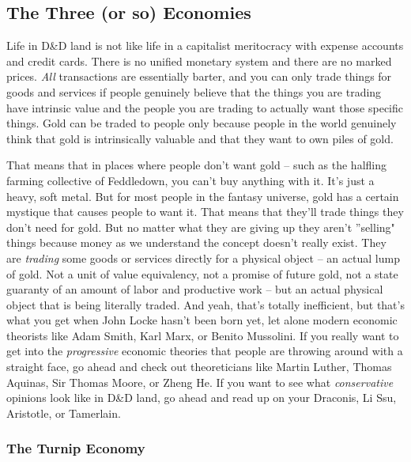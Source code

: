 \subsection{The Three (or so) Economies}
\vspace*{-8pt}

Life in D\&D land is not like life in a capitalist meritocracy with expense accounts and credit cards. There is no unified monetary system and there are no marked prices. \textit{All} transactions are essentially barter, and you can only trade things for goods and services if people genuinely believe that the things you are trading have intrinsic value and the people you are trading to actually want those specific things. Gold can be traded to people only because people in the world genuinely think that gold is intrinsically valuable and that they want to own piles of gold.

That means that in places where people don't want gold -- such as the halfling farming collective of Feddledown, you can't buy anything with it. It's just a heavy, soft metal. But for most people in the fantasy universe, gold has a certain mystique that causes people to want it. That means that they'll trade things they don't need for gold. But no matter what they are giving up they aren't ''selling" things because money as we understand the concept doesn't really exist. They are \textit{trading} some goods or services directly for a physical object -- an actual lump of gold. Not a unit of value equivalency, not a promise of future gold, not a state guaranty of an amount of labor and productive work -- but an actual physical object that is being literally traded. And yeah, that's totally inefficient, but that's what you get when John Locke hasn't been born yet, let alone modern economic theorists like Adam Smith, Karl Marx, or Benito Mussolini. If you really want to get into the \textit{progressive} economic theories that people are throwing around with a straight face, go ahead and check out theoreticians like Martin Luther, Thomas Aquinas, Sir Thomas Moore, or Zheng He. If you want to see what \textit{conservative} opinions look like in D\&D land, go ahead and read up on your Draconis, Li Ssu, Aristotle, or Tamerlain.

\subsubsection{The Turnip Economy}
\vspace*{-8pt}

